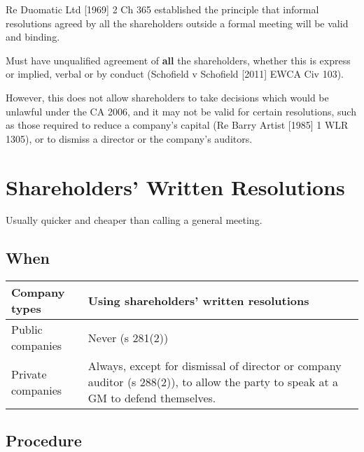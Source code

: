 \documentclass[
]{article}
\begin{document}
Re Duomatic Ltd {[}1969{]} 2 Ch 365 established the principle that
informal resolutions agreed by all the shareholders outside a formal
meeting will be valid and binding.

Must have unqualified agreement of \textbf{all} the shareholders,
whether this is express or implied, verbal or by conduct (Schofield v
Schofield {[}2011{]} EWCA Civ 103).

However, this does not allow shareholders to take decisions which would
be unlawful under the CA 2006, and it may not be valid for certain
resolutions, such as those required to reduce a company's capital (Re
Barry Artist {[}1985{]} 1 WLR 1305), or to dismiss a director or the
company's auditors.

\hypertarget{shareholders-written-resolutions}{%
\section{Shareholders' Written
Resolutions}\label{shareholders-written-resolutions}}

Usually quicker and cheaper than calling a general meeting.

\hypertarget{when}{%
\subsection{When}\label{when}}

\begin{longtable}[]{@{}ll@{}}
\toprule()
Company types & Using shareholders' written resolutions \\
\midrule()
\endhead
Public companies & Never (s 281(2)) \\
Private companies & Always, except for dismissal of director or company
auditor (s 288(2)), to allow the party to speak at a GM to defend
themselves. \\
\bottomrule()
\end{longtable}

\hypertarget{procedure}{%
\subsection{Procedure}\label{procedure}}
\end{document}
